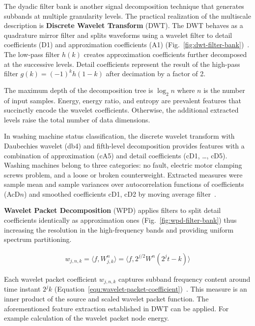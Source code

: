 The dyadic filter bank is another signal decomposition technique that generates subbands at multiple granularity levels. The practical realization of the multiscale description is \textbf{Discrete Wavelet Transform} (DWT). The DWT behaves as a quadrature mirror filter and splits waveforms using a wavelet filter to detail coefficients (D1) and approximation coefficients (A1) (Fig.~\ref{fig:dwt-filter-bank})~\cite{nandi_condition_2019}. The low-pass filter $h(k)$ creates approximation coefficients further decomposed at the successive levels. Detail coefficients represent the result of the high-pass filter $g(k) = (-1)^k h(1 - k)$ after decimation by a factor of 2.

The maximum depth of the decomposition tree is $\log_2{n}$ where $n$ is the number of input samples. Energy, energy ratio, and entropy are prevalent features that succinctly encode the wavelet coefficients. Otherwise, the additional extracted levels raise the total number of data dimensions.

In washing machine status classification, the discrete wavelet transform with Daubechies wavelet (db4) and fifth-level decomposition provides features with a combination of approximation (cA5) and detail coefficients (cD1, \dots, cD5). Washing machines belong to three categories: no fault, electric motor clamping screws problem, and a loose or broken counterweight. Extracted measures were sample mean and sample variances over autocorrelation functions of coefficients (AcD$n$) and smoothed coefficients cD1, cD2 by moving average filter~\cite{goumas_classification_2002}.

\textbf{Wavelet Packet Decomposition} (WPD) applies filters to split detail coefficients identically as approximation ones (Fig.~\ref{fig:wpd-filter-bank}) thus increasing the resolution in the high-frequency bands and providing uniform spectrum partitioning.

\begin{ceqn}\begin{align}
 w_{j,n,k} = \langle f, W_{j,k}^n\rangle = \langle f, 2^{j/2} W^n (2^jt-k) \rangle
\label{equ:wavelet-packet-coefficient}
\end{align}\end{ceqn}

Each wavelet packet coefficient $w_{j,n,k}$ captures subband frequency content around time instant $2^j k$ (Equation~\ref{equ:wavelet-packet-coefficient})~\cite{yen_wavelet_2000}. This measure is an inner product of the source and scaled wavelet packet function. The aforementioned feature extraction established in DWT can be applied. For example calculation of the wavelet packet node energy.


